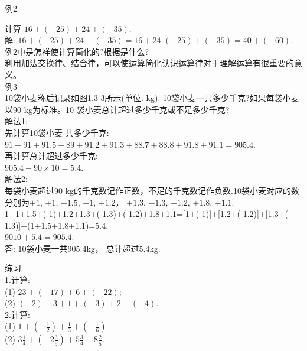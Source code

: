 \documentclass{article}
\begin{document}
\begin{example}
    
    例2
    
    计算 $16+(-25)+24+(-35)$.\\
    
    解: $16+(-25)+24+(-35)=16+24$ $(-25)+(-35)=40+(-60)$.\\
    
    例2中是怎祥使计算简化的?根据是什么?\\
    
    利用加法交换律、结合律，可以使运算简化认识运算律对于理解运算有很重要的意义。\\
    
    例3\\
    
    10袋小麦称后记录如图1.3-3所示(单位: kg). 10袋小麦一共多少千克?如果每袋小麦以90 kg为标准。10 袋小麦总计超过多少千克或不足多少千克?\\
    
    解法1:\\
    
    先计算10袋小麦-共多少千克:\\

    $91+91+91.5+89+91.2+91.3+88.7+88.8+91.8+91.1=905.4$.\\
    
    再计算总计超过多少千克:\\
    
    $905.4-90\times10=5.4$.\\

    解法2:\\
    每袋小麦超过90 kg的千克数记作正数，不足的千克数记作负数.10袋小麦对应的数分别为$+1$, $+1$, $+1.5$, $-1$, $+1.2$， $+1.3$, $-1.3$, $- 1.2$, $+1.8$, $+1.1$.\\

    1+1+1.5+(-1)+1.2+1.3+(-1.3)+(-1.2)+1.8+1.1=[1+(-1)]+[1.2+(-1.2)]+[1.3+(- 1.3)]+(1+1.5+1.8+1.1)=5.4.\\
    
    $9010+5.4=905.4$.\\

    答: 10袋小麦一共905.4kg， 总计超过5.4kg.\\
    
\end{example}

\begin{exercise}
    
    练习\\

    1.计算:\\

    (1) $23+(-17)+6+(-22)$;\\
    
    (2) $(-2)+3+1+(-3)+2+(-4)$.\\

    2.计算:\\

    (1) $1+(-\frac{1}{2})+\frac{1}{3}+(-\frac{1}{6})$\\
    
    (2) $3\frac{1}{4}+(-2\frac{3}{5})+5\frac{3}{4}-8\frac{2}{5}$.\\
    
\end{exercise}
    
    
    
    
\end{document}
